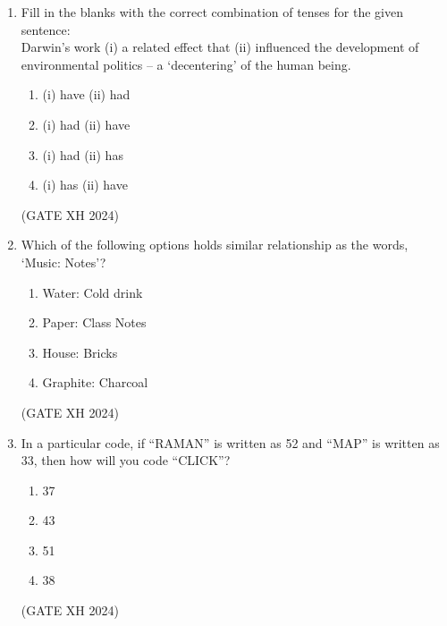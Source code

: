 \documentclass{article}
\begin{document}
\begin{enumerate}[leftmargin=*, start=11, label=Q.\arabic*.]
    \item Fill in the blanks with the correct combination of tenses for the given sentence: \\
    Darwin’s work (i)\makebox[1.5cm]{\hrulefill} a related effect that (ii)\makebox[1.5cm]{\hrulefill} influenced the development of environmental politics – a ‘decentering’ of the human being.
    
    \begin{multicols}{4}
        \begin{enumerate}
            \item (i) have (ii) had
            \item (i) had (ii) have
            \item (i) had (ii) has
            \item (i) has (ii) have
        \end{enumerate}
    \end{multicols} \hfill (GATE XH 2024)

    \item Which of the following options holds similar relationship as the words, ‘Music: Notes’?
    
    \begin{multicols}{4}
        \begin{enumerate}
            \item  Water: Cold drink
            \item Paper: Class Notes
            \item  House: Bricks
            \item Graphite: Charcoal
        \end{enumerate}
    \end{multicols} \hfill (GATE XH 2024)

    \item In a particular code, if “RAMAN” is written as 52 and “MAP” is written as 33, then how will you code “CLICK”?
    
    \begin{multicols}{4}
        \begin{enumerate}
            \item 37
            \item 43
            \item 51
            \item 38
        \end{enumerate}
    \end{multicols} \hfill (GATE XH 2024)

\end{enumerate}    
\end{document}
